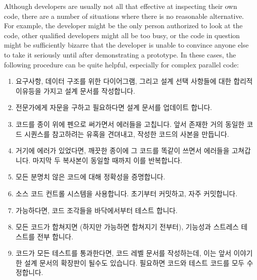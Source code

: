 Although developers are usually not all that effective at inspecting
their own code, there are a number of situations where there is no
reasonable alternative.
For example, the developer might be the only person authorized to look
at the code, other qualified developers might all be too busy, or
the code in question might be sufficiently bizarre that the developer
is unable to convince anyone else to take it seriously until after
demonstrating a prototype.
In these cases, the following procedure can be quite helpful,
especially for complex parallel code:
\fi

\begin{enumerate}
\item	요구사항, 데이터 구조를 위한 다이어그램, 그리고 설계 선택 사항들에 대한
	합리적 이유등을 가지고 설계 문서를 작성합니다.
\item	전문가에게 자문을 구하고 필요하다면 설계 문서를 업데이트 합니다.
\item	코드를 종이 위에 펜으로 써가면서 에러들을 고칩니다.
	앞서 존재한 거의 동일한 코드 시퀀스를 참고하려는 유혹을 견뎌내고,
	작성한 코드의 사본을 만듭니다.
\item	거기에 에러가 있었다면, 깨끗한 종이에 그 코드를 똑같이 쓰면서 에러들을
	고쳐갑니다.
	마지막 두 복사본이 동일할 때까지 이를 반복합니다.
\item	모든 분명치 않은 코드에 대해 정확성을 증명합니다.
\item	소스 코드 컨트롤 시스템을 사용합니다.
	초기부터 커밋하고, 자주 커밋합니다.
\item	가능하다면, 코드 조각들을 바닥에서부터 테스트 합니다.
\item	모든 코드가 합쳐지면 (하지만 가능하면 합쳐지기 전부터), 기능성과
	스트레스 테스트를 전부 합니다.
\item	코드가 모든 테스트를 통과한다면, 코드 레벨 문서를 작성하는데, 이는 앞서
	이야기한 설계 문서의 확장판이 될수도 있습니다.
	필요하면 코드와 테스트 코드를 모두 수정합니다.
\iffalse


\end{enumerate}
